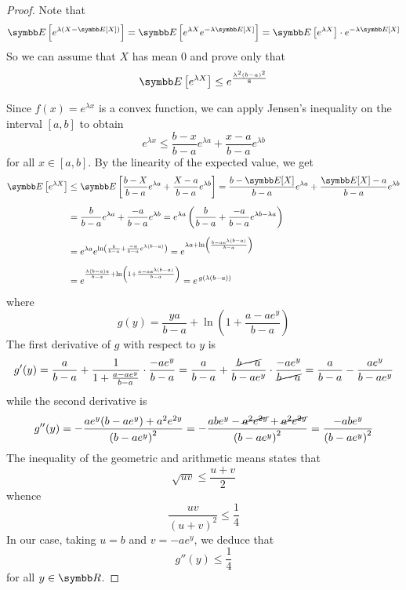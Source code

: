 \begin{proof}
Note that
\[
    \expectedvalue\left[e^{\lambda \left(X - \expectedvalue[X]\right)}\right] = \expectedvalue\left[e^{\lambda X} e^{-\lambda \expectedvalue[X]}\right] = \expectedvalue\left[e^{\lambda X}\right] \cdot e^{-\lambda \expectedvalue[X]}
\]
So we can assume that \(X\) has mean \(0\) and prove only that
\[
    \expectedvalue\left[e^{\lambda X}\right] \leq e^{\frac{\lambda^2 (b - a)^2}{8}}
\]

Since \(f(x) = e^{\lambda x}\) is a convex function, we can apply Jensen's inequality \cite{Jensen1906} on the interval \([a, b]\) to obtain
\[
    e^{\lambda x} \leq \frac{b - x}{b - a} e^{\lambda a} + \frac{x - a}{b - a} e^{\lambda b}
\]
for all \(x \in [a, b]\). By the linearity of the expected value, we get
\begin{align*}
    \expectedvalue\left[e^{\lambda X}\right] &\leq \expectedvalue\left[\frac{b - X}{b - a} e^{\lambda a} + \frac{X - a}{b - a} e^{\lambda b}\right]
    = \frac{b - \expectedvalue[X]}{b - a} e^{\lambda a} + \frac{\expectedvalue[X] - a}{b - a} e^{\lambda b} \\[0.5em]
    &= \frac{b}{b - a} e^{\lambda a} + \frac{-a}{b - a} e^{\lambda b}
    = e^{\lambda a} \left(\frac{b}{b - a} + \frac{- a}{b - a} e^{\lambda b - \lambda a}\right) \\[0.5em]
    &= e^{\lambda a} e^{\ln \left(\frac{b}{b - a} + \frac{- a}{b - a} e^{\lambda (b - a)}\right)}
    = e^{\lambda a + \ln \left(\frac{b - a e^{\lambda (b - a)}}{b - a}\right)} \\[0.5em]
    &= e^{\frac{\lambda (b - a) a}{b - a} + \ln \left(1 + \frac{a - a e^{\lambda (b - a)}}{b - a}\right)}
    = e^{\, g(\lambda (b - a))}
\end{align*}
where
\[
    g(y) = \frac{y a}{b - a} + \ln \left(1 + \frac{a - a e^y}{b - a}\right)
\]
The first derivative of \(g\) with respect to \(y\) is
\[
    g'(y) = \frac{a}{b - a} + \frac{1}{1 + \frac{a - a e^y}{b - a}} \cdot \frac{- a e^y}{b - a}
    = \frac{a}{b - a} + \frac{\cancel{b - a}}{b - a e^y} \cdot \frac{- a e^y}{\cancel{b - a}} 
    = \frac{a}{b - a} - \frac{a e^y}{b - a e^y}
\]
while the second derivative is
\[
    g''(y) = - \frac{a e^y (b - a e^y) + a^2 e^{2y}}{\left(b - a e^y\right)^2} = - \frac{ab e^y - \cancel{a^2 e^{2y}} + \cancel{a^2 e^{2y}}}{\left(b - a e^y\right)^2} = \frac{- a b e^y}{\left(b - a e^y\right)^2}
\]
The inequality of the geometric and arithmetic means states that
\[
    \sqrt{u v} \leq \frac{u + v}{2}
\]
whence
\[
    \frac{u v}{(u + v)^2} \leq \frac{1}{4}
\]
In our case, taking \(u = b\) and \(v = - a e^y\), we deduce that
\[
    g''(y) \leq \frac{1}{4}
\]
for all \(y \in \reals\).


\end{proof}
